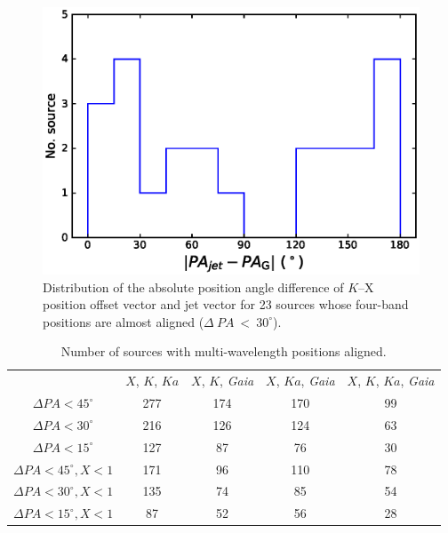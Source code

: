 \documentclass{aa-note}   %
\begin{document}
\begin{figure}[hbtp]
    \centering
    \includegraphics[width=\columnwidth]{figs/jet-pa-com}
    \caption[]{\label{fig:jet-pa-com}
        Distribution of the absolute position angle difference of $K$--X position offset vector and jet vector for 23 sources whose four-band positions are almost aligned ($\Delta~PA~<~30^{\circ}$).
    }
\end{figure}

%
\begin{table}[htbp]
    \centering
    \caption{\label{tab:no_sou_aligned}
        Number of sources with multi-wavelength positions aligned.
    }
    \begin{tabular}{ccccc}
        \hline \noalign{\smallskip}
        &$X$, $K$, $Ka$ &$X$, $K$, \textit{\it Gaia} &$X$, $Ka$, \textit{\it Gaia} &$X$, $K$, $Ka$, \textit{\it Gaia}\\
        \noalign{\smallskip}
        \hline 
        \noalign{\smallskip}
        $\Delta PA<45^\circ$       &277  &174  &170  &99\\
        $\Delta PA<30^\circ$       &216  &126  &124  &63\\     
        $\Delta PA<15^\circ$       &127  &87   &76   &30\\
        $\Delta PA<45^\circ, X<1$  &171  &96   &110  &78\\
        $\Delta PA<30^\circ, X<1$  &135  &74   &85   &54\\
        $\Delta PA<15^\circ, X<1$  &87   &52   &56   &28\\
        \hline
    \end{tabular}
\end{table}
\end{document}
